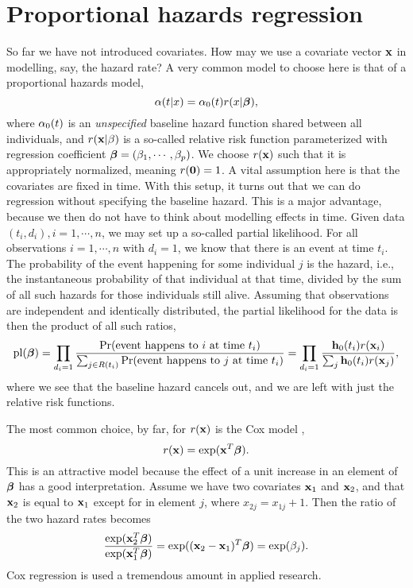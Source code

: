 \section{Proportional hazards regression}
So far we have not introduced covariates. How may we use a covariate vector $\mathbf{x}$ in modelling, say, the hazard rate? A very common model to choose here is that of a proportional hazards model,
\begin{equation}\label{PH}
    \alpha(t|x)=\alpha_0(t)r(x|\boldsymbol{\beta}),
\end{equation}
where $\alpha_0(t)$ is an \textit{unspecified} baseline hazard function shared between all individuals, and $r(\mathbf{x}|\beta)$ is a so-called relative risk function parameterized with regression coefficient $\boldsymbol{\beta}=(\beta_1,\cdots,\beta_p)$. We choose $r(\mathbf{x})$ such that it is appropriately normalized, meaning $r(\mathbf{0})=1$. A vital assumption here is that the covariates are fixed in time. With this setup, it turns out that we can do regression without specifying the baseline hazard. This is a major advantage, because we then do not have to think about modelling effects in time. Given data $(t_i,d_i),i=1,\cdots,n$, we may set up a so-called partial likelihood.  For all observations $i=1,\cdots,n$ with $d_i=1$, we know that there is an event at time $t_i$. The probability of the event happening for some individual $j$ is the hazard, i.e., the instantaneous probability of that individual at that time, divided by the sum of all such hazards for those individuals still alive. Assuming that observations are independent and identically distributed, the partial likelihood for the data is then the product of all such ratios,
\begin{equation*}
    \operatorname{pl}(\boldsymbol{\beta})=\prod_{d_i=1}\frac{\Pr(\text{event happens to }i\text{ at time }t_i)}{\sum_{j\in R(t_i)}\Pr(\text{event happens to }j\text{ at time }t_i)}=\prod_{d_i=1}\frac{\mathbf{h}_0(t_i)r(\mathbf{x}_i)}{\sum_j \mathbf{h}_0(t_i)r(\mathbf{x}_j)},
\end{equation*}
where we see that the baseline hazard cancels out, and we are left with just the relative risk functions.

The most common choice, by far, for $r(\mathbf{x})$ is the Cox model \citep{cox},
\begin{equation*}
    r(\mathbf{x})=\exp(\mathbf{x}^T\boldsymbol{\beta}).
\end{equation*}
This is an attractive model because the effect of a unit increase in an element of $\boldsymbol{\beta}$ has a good interpretation. Assume we have two covariates $\mathbf{x}_1$ and $\mathbf{x}_2$, and that $\mathbf{x}_2$ is equal to $\mathbf{x}_1$ except for in element $j$, where $x_{2j}=x_{1j}+1$. Then the ratio of the two hazard rates becomes
\begin{equation*}
    \frac{\exp(\mathbf{x}_2^T\boldsymbol{\beta})}{\exp(\mathbf{x}_1^T\boldsymbol{\beta})}=\exp((\mathbf{x}_2-\mathbf{x}_1)^T\boldsymbol{\beta})=\exp(\beta_j).
\end{equation*}
Cox regression is used a tremendous amount in applied research.

